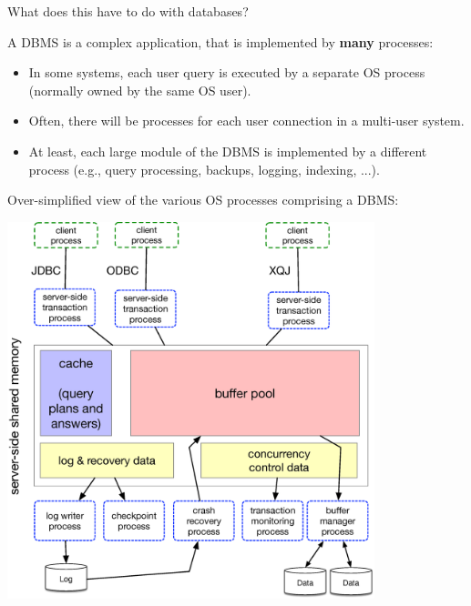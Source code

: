 

\begin{frame}

What does this have to do with databases?

A DBMS is a complex application, that is implemented by \textbf{many} processes:
\begin{itemize}[-, noitemsep]
\item In some systems, each user query is executed by a separate OS process (normally owned by the same OS user).
\item Often, there will be processes for each user connection in a multi-user system.
\item At least, each large module of the DBMS is implemented by a different process (e.g., query processing, backups, logging, indexing, ...).
\end{itemize}
\end{frame}

\begin{frame}

Over-simplified view of the various OS processes comprising a DBMS:


\includegraphics[width=0.8\textwidth]{figures/processes_memory_disks.eps}

\end{frame}
